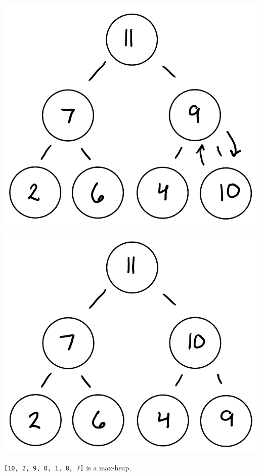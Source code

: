\documentclass[12pt,twoside]{article}
\begin{document}
\begin{problems}
\begin{problemparts}
\begin{center}
        \includegraphics[scale=0.4]{Images/P1A4vi.PNG}
    \end{center}
    \begin{center}
        \includegraphics[scale=0.4]{Images/P1A4v.PNG}
    \end{center}
    {\tt [10, 2, 9, 0, 1, 8, 7]} is a max-heap.
    \begin{center}

\end{center}
\end{problemparts}
\end{problems}
\end{document}
